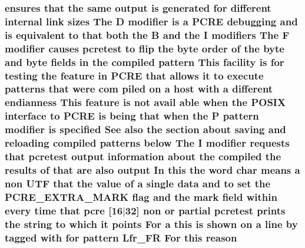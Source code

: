 \subsubsection[{\texorpdfstring{reason}{reason}}]{ ensures that the same {\bf output} {\bf is} {\bf generated} for different internal link sizes The {\bf D} {\bf modifier} {\bf is} {\bf a} {\bf P\+C\+RE} debugging and {\bf is} equivalent {\bf to} that both the {\bf B} and the {\bf I} {\bf modifiers} The {\bf F} {\bf modifier} causes {\bf pcretest} {\bf to} flip the byte {\bf order} {\bf of} the byte and byte {\bf fields} {\bf in} the {\bf compiled} {\bf pattern} This {\bf facility} {\bf is} for testing the {\bf feature} {\bf in} {\bf P\+C\+RE} that allows {\bf it} {\bf to} execute {\bf patterns} that were com piled {\bf on} {\bf a} {\bf host} {\bf with} {\bf a} different endianness This {\bf feature} {\bf is} {\bf not} avail {\bf able} when the P\+O\+S\+IX interface {\bf to} {\bf P\+C\+RE} {\bf is} being that when the P {\bf pattern} {\bf modifier} {\bf is} {\bf specified} See also the {\bf section} about saving and reloading {\bf compiled} {\bf patterns} {\bf below} The {\bf I} {\bf modifier} {\bf requests} that {\bf pcretest} {\bf output} information about the {\bf compiled} the {\bf results} {\bf of} that {\bf are} also {\bf output} In {\bf this} the {\bf word} char means {\bf a} non U\+TF that the {\bf value} {\bf of} {\bf a} single {\bf data} and {\bf to} {\bf set} the {\bf P\+C\+R\+E\+\_\+\+E\+X\+T\+R\+A\+\_\+\+M\+A\+RK} {\bf flag} and the {\bf mark} {\bf field} within every {\bf time} that {\bf pcre} \mbox{[}16$\vert$32\mbox{]} non {\bf or} {\bf partial} {\bf pcretest} prints the {\bf string} {\bf to} {\bf which} {\bf it} points For {\bf a} {\bf this} {\bf is} shown {\bf on} {\bf a} {\bf line} by tagged {\bf with} for {\bf pattern} Lfr\+\_\+\+FR For {\bf this} reason}\hypertarget{pcretest_8txt_add3d259d75976458fd7060610f3a411c}{}\label{pcretest_8txt_add3d259d75976458fd7060610f3a411c}
